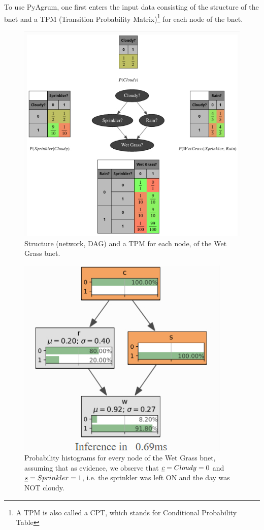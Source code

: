 To use PyAgrum, one first enters the input data consisting of the structure of the bnet and a TPM (Transition Probability Matrix)\footnote{A TPM is also called
a CPT, which stands for Conditional Probability Table}
for each node of the bnet.


\begin{figure}[h!]
\centering
\includegraphics[width=6in]
{bnet-apps/wet-grass-bnet}
\caption{Structure (network, DAG) and a TPM for each node, of the Wet
Grass
bnet.}
\label{fig-wet-grass-bnet}
\end{figure}


\begin{figure}[h!]
\centering
\includegraphics[width=4in]
{bnet-apps/wet-grass-evidence}
\caption{Probability histograms for every node of the Wet Grass bnet,
assuming that as evidence, we observe that ${\underline{c}}=Cloudy=0$ and ${\underline{s}}=Sprinkler=1$, i.e. the sprinkler was left ON and the day was NOT cloudy.}
\label{fig-wet-grass-evidence}
\end{figure}

